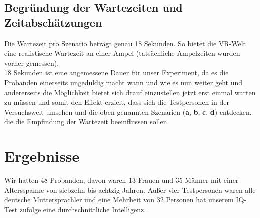 \documentclass{Paper}
\begin{document}
	\subsection{Begründung der Wartezeiten und Zeitabschätzungen}
		Die Wartezeit pro Szenario beträgt genau 18 Sekunden. So bietet die VR-Welt eine realistische Wartezeit an einer Ampel (tatsächliche Ampelzeiten wurden vorher gemessen). \\
18 Sekunden ist eine angemessene Dauer für unser Experiment, da es die Probanden einerseits ungeduldig macht wann und wie es nun weiter geht und andererseits die Möglichkeit bietet sich drauf einzustellen jetzt erst einmal warten zu müssen und somit den Effekt erzielt, dass sich die Testpersonen in der Versuchswelt umsehen und die oben genannten Szenarien (\textbf{a}, \textbf{b}, \textbf{c}, \textbf{d}) entdecken, die die Empfindung der Wartezeit beeinflussen sollen.

\section{Ergebnisse}
Wir hatten 48 Probanden, davon waren 13 Frauen und 35 Männer mit einer Altersspanne von siebzehn bis achtzig Jahren. Außer vier Testpersonen waren alle deutsche Muttersprachler und eine Mehrheit von 32 Personen hat unserem IQ-Test zufolge eine durchschnittliche Intelligenz.
\end{document}
